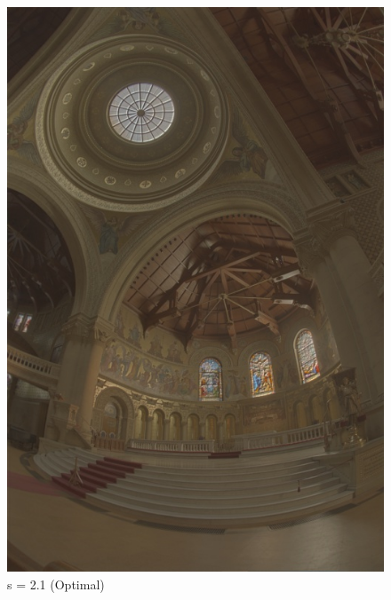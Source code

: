 \documentclass{article}
\begin{document}
\begin{figure}[!htb]
      \includegraphics[scale=.27]{./data/3/svar/s2.jpg}
      \caption{s = 2.1 (Optimal)}
    \endminipage\hfill

\end{figure}
\end{document}
